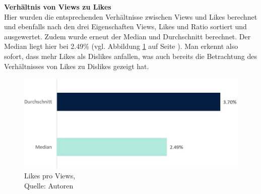 \documentclass[12pt,titlepage]{article}
\begin{document}
\textbf{Verhältnis von Views zu Likes}\\
Hier wurden die entsprechenden Verhältnisse zwischen Views und Likes berechnet und ebenfalls nach den drei Eigenschaften Views, Likes und Ratio sortiert und ausgewertet. Zudem wurde erneut der Median und Durchschnitt berechnet. Der Median liegt hier bei 2.49\% (vgl. Abbildung \ref{img:Likes pro Views} auf Seite \pageref{img:Likes pro Views}). Man erkennt also sofort, dass mehr Likes als Dislikes anfallen, was auch bereits die Betrachtung des Verhältnisses von Likes zu Dislikes gezeigt hat.
\begin{figure}[h]
	\centering
	\includegraphics[width=12cm]{IMG/grafik_likesviews.JPG}
	\caption[Likes pro Views]{Likes pro Views,\\ Quelle: Autoren}
	\label{img:Likes pro Views}
\end{figure}
\end{document}
